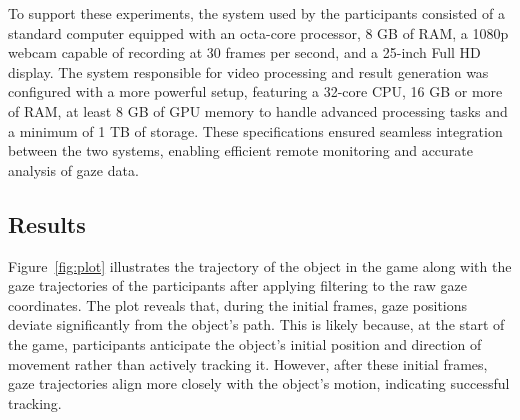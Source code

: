 \documentclass[10pt,a4paper,twoside]{article}
\begin{document}
To support these experiments, the system used by the participants consisted of a standard computer equipped with an octa-core processor, 8 GB of RAM, a 1080p webcam capable of recording at 30 frames per second, and a 25-inch Full HD display. The system responsible for video processing and result generation was configured with a more powerful setup, featuring a 32-core CPU, 16 GB or more of RAM, at least 8 GB of GPU memory to handle advanced processing tasks and a minimum of 1 TB of storage. These specifications ensured seamless integration between the two systems, enabling efficient remote monitoring and accurate analysis of gaze data.

\subsection{Results}
\label{result}

Figure~\ref{fig:plot} illustrates the trajectory of the object in the game along with the gaze trajectories of the participants after applying filtering to the raw gaze coordinates. The plot reveals that, during the initial frames, gaze positions deviate significantly from the object's path. This is likely because, at the start of the game, participants anticipate the object's initial position and direction of movement rather than actively tracking it. However, after these initial frames, gaze trajectories align more closely with the object's motion, indicating successful tracking.
\end{document}
